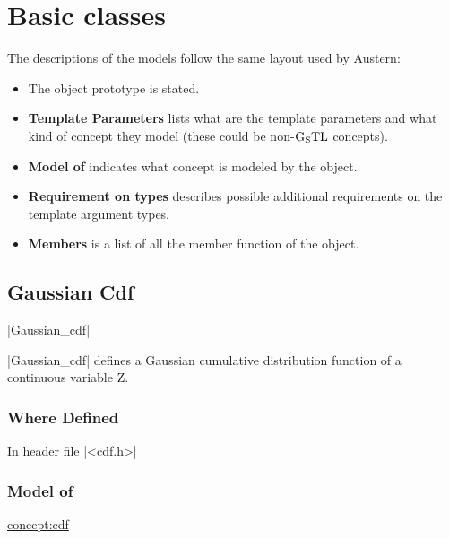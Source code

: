 \documentclass[12pt,twoside]{report}
\newcommand{\gtl}{$\rm{G_STL}$}
\begin{document}
\section{Basic classes}

The descriptions of the models follow the same layout used by Austern:

\begin{itemize}
\item The object prototype is stated.
\item  {\bf Template Parameters} lists what are the template parameters and what kind of concept they model (these could be non-\gtl{} concepts).
\item {\bf Model of} indicates what concept is modeled by the object.
\item {\bf Requirement on types} describes possible additional requirements on the template argument types.
\item {\bf Members} is a list of all the member function of the object.
\end{itemize}
 


\subsection{Gaussian Cdf}
|Gaussian_cdf|
\vspace{0.3cm}

|Gaussian_cdf| defines a Gaussian cumulative distribution function of a continuous variable Z.  

 
\htmlrule[CLEAR=all]  \subsubsection*{Where Defined}
In header file |<cdf.h>|

\htmlrule[CLEAR=all]  \subsubsection*{Model of}
\hyperref{CDF}{CDF}{}{concept:cdf}
\end{document}
